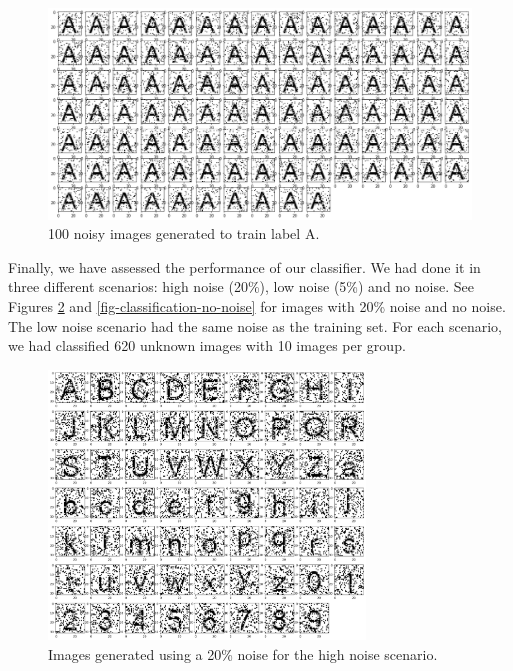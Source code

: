 \begin{figure}[!htb]
\centering\includegraphics[width=\textwidth]{./images02/classification/trainingA.png}
\caption{100 noisy images generated to train label A.
\label{fig-classification-training-A}}
\end{figure}

Finally, we have assessed the performance of our classifier. We had done it in three different scenarios: high noise (20\%), low noise (5\%) and no noise. See Figures \ref{fig-classification-noise-high} and \ref{fig-classification-no-noise} for images with 20\% noise and no noise. The low noise scenario had the same noise as the training set. For each scenario, we had classified 620 unknown images with 10 images per group.

\begin{figure}[!htb]
\centering\includegraphics[width=0.75\textwidth]{./images02/classification/noise-high.png}
\caption{Images generated using a 20\% noise for the high noise scenario.
\label{fig-classification-noise-high}}
\end{figure}

